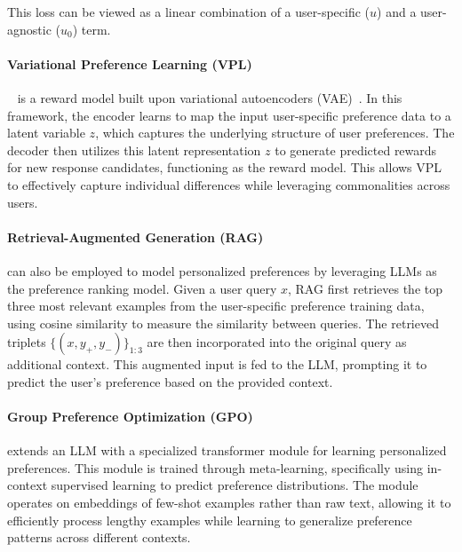 \vspace{-0.2cm}
This loss can be viewed as a linear combination of a user-specific ($u$) and a user-agnostic ($u_0$) term.



\paragraph{Variational Preference Learning (VPL)}~\cite{poddar_personalizing_2024} is a reward model built upon variational autoencoders (VAE)~\citep{Kingma2014}. In this framework, the encoder learns to map the input user-specific preference data to a latent variable $z$, which captures the underlying structure of user preferences. The decoder then utilizes this latent representation $z$ to generate predicted rewards for new response candidates, functioning as the reward model. This allows VPL to effectively capture individual differences while leveraging commonalities across users.



\paragraph {Retrieval-Augmented Generation (RAG)} can also be employed to model personalized preferences by leveraging LLMs as the preference ranking model. 
Given a user query $x$, RAG first retrieves the top three most relevant examples from the user-specific preference training data, using cosine similarity to measure the similarity between queries.
The retrieved triplets $\{(x, y_+, y_-)\}_{1:3}$ are then incorporated into the original query as additional context. This augmented input is fed to the LLM, prompting it to predict the user's preference based on the provided context.



\paragraph{Group Preference Optimization (GPO)} \citep{zhao_group_2023} extends an LLM with a specialized transformer module for learning personalized preferences. This module is trained through meta-learning, specifically using in-context supervised learning to predict preference distributions. The module operates on embeddings of few-shot examples rather than raw text, allowing it to efficiently process lengthy examples while learning to generalize preference patterns across different contexts.
